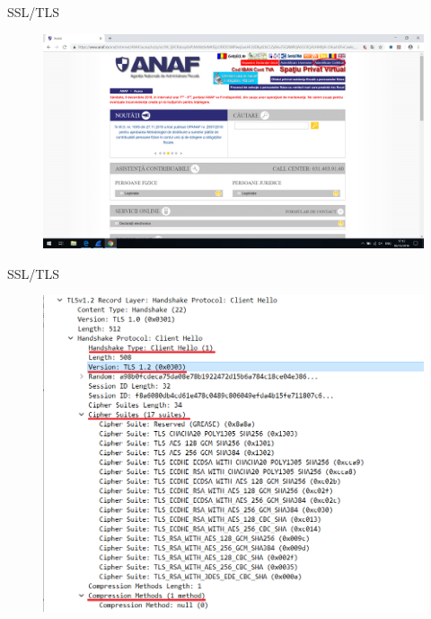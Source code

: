 \documentclass[pdf]{beamer}
\begin{document}
\begin{frame}{SSL/TLS}

\begin{figure}[t]
\centering
\includegraphics[scale=0.28]{Images/tls1a}
\end{figure}

\end{frame}



\begin{frame}{SSL/TLS}

\begin{figure}[t]
\centering
\includegraphics[scale=0.5]{Images/tls1b}
\end{figure}

\end{frame}
\end{document}
